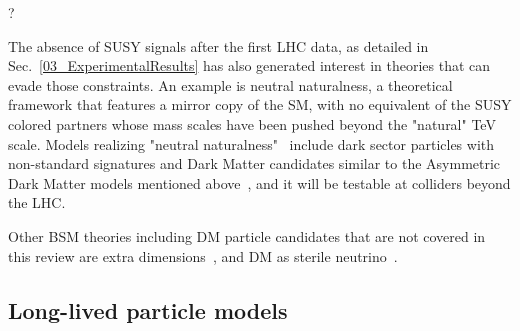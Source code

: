 \begin{marginnote}[]
\end{marginnote}
?

The absence of SUSY signals after the first LHC data, as detailed in Sec.~\ref{03_ExperimentalResults}
has also generated interest in theories that can evade those constraints. 
An example is neutral naturalness, a theoretical framework that features a mirror copy of the SM,
with no equivalent of the SUSY colored partners whose mass scales have been
pushed beyond the "natural" TeV scale. Models realizing "neutral naturalness"~\cite{Craig:2014aea}
include dark sector particles with non-standard signatures and Dark Matter candidates similar to the
Asymmetric Dark Matter models mentioned above~\cite{Garcia:2015toa},
and it will be testable at colliders beyond the LHC. 

Other BSM theories including DM particle candidates that are not covered in this review are
extra dimensions~\cite{Hooper:2007qk}, and DM as sterile neutrino~\cite{Adhikari:2016bei}.

\subsection{Long-lived particle models}
\label{sec:LLPModels}


